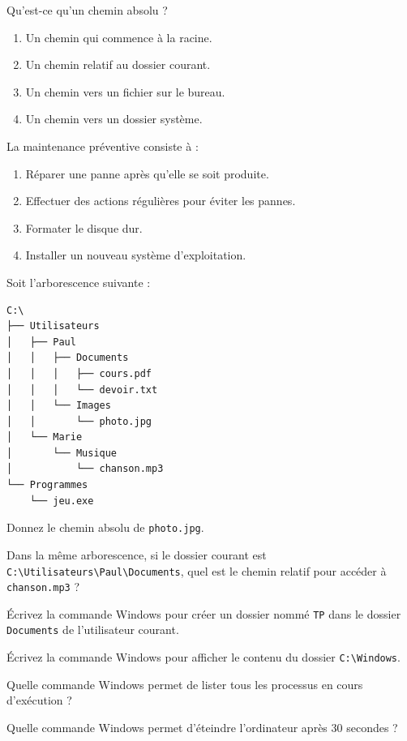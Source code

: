 \exo{}
Qu'est-ce qu'un chemin absolu ?
\begin{enumerate}[label=\Alph*.]
    \item Un chemin qui commence à la racine.
    \item Un chemin relatif au dossier courant.
    \item Un chemin vers un fichier sur le bureau.
    \item Un chemin vers un dossier système.
\end{enumerate}

\exo{}
La maintenance préventive consiste à :
\begin{enumerate}[label=\Alph*.]
    \item Réparer une panne après qu'elle se soit produite.
    \item Effectuer des actions régulières pour éviter les pannes.
    \item Formater le disque dur.
    \item Installer un nouveau système d'exploitation.
\end{enumerate}


\exo{}
Soit l'arborescence suivante :
\begin{verbatim}
C:\
├── Utilisateurs
│   ├── Paul
│   │   ├── Documents
│   │   │   ├── cours.pdf
│   │   │   └── devoir.txt
│   │   └── Images
│   │       └── photo.jpg
│   └── Marie
│       └── Musique
│           └── chanson.mp3
└── Programmes
    └── jeu.exe
\end{verbatim}
Donnez le chemin absolu de \texttt{photo.jpg}.

\exo{}
Dans la même arborescence, si le dossier courant est \texttt{C:\textbackslash Utilisateurs\textbackslash Paul\textbackslash Documents}, quel est le chemin relatif pour accéder à \texttt{chanson.mp3} ?

\exo{}
Écrivez la commande Windows pour créer un dossier nommé \texttt{TP} dans le dossier \texttt{Documents} de l'utilisateur courant.

\exo{}
Écrivez la commande Windows pour afficher le contenu du dossier \texttt{C:\textbackslash Windows}.


\exo{}
Quelle commande Windows permet de lister tous les processus en cours d'exécution ?

\exo{}
Quelle commande Windows permet d'éteindre l'ordinateur après 30 secondes ?

